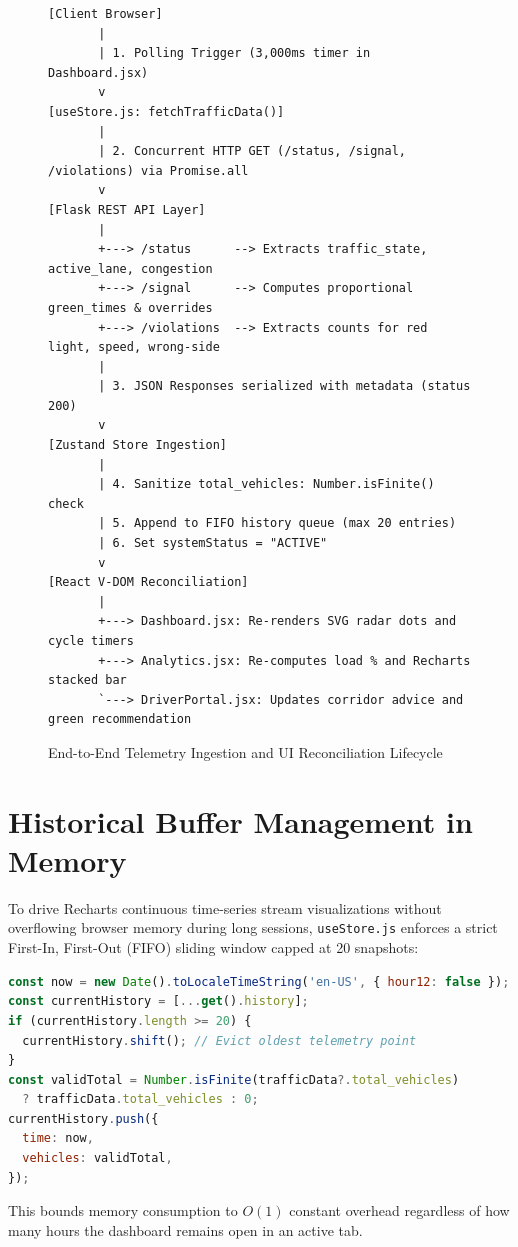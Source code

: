 \documentclass[11pt,a4paper,oneside]{report}
\begin{document}
\begin{figure}[h!]
\centering
\small
\begin{tcolorbox}[colback=white,colframe=branddark,arc=2mm,title=\textbf{End-to-End State Synchronization Flow}]
\begin{verbatim}
[Client Browser]
       |
       | 1. Polling Trigger (3,000ms timer in Dashboard.jsx)
       v
[useStore.js: fetchTrafficData()]
       |
       | 2. Concurrent HTTP GET (/status, /signal, /violations) via Promise.all
       v
[Flask REST API Layer]
       |
       +---> /status      --> Extracts traffic_state, active_lane, congestion
       +---> /signal      --> Computes proportional green_times & overrides
       +---> /violations  --> Extracts counts for red light, speed, wrong-side
       |
       | 3. JSON Responses serialized with metadata (status 200)
       v
[Zustand Store Ingestion]
       |
       | 4. Sanitize total_vehicles: Number.isFinite() check
       | 5. Append to FIFO history queue (max 20 entries)
       | 6. Set systemStatus = "ACTIVE"
       v
[React V-DOM Reconciliation]
       |
       +---> Dashboard.jsx: Re-renders SVG radar dots and cycle timers
       +---> Analytics.jsx: Re-computes load % and Recharts stacked bar
       `---> DriverPortal.jsx: Updates corridor advice and green recommendation
\end{verbatim}
\end{tcolorbox}
\caption{End-to-End Telemetry Ingestion and UI Reconciliation Lifecycle}
\label{fig:data_flow_diag}
\end{figure}

\section{Historical Buffer Management in Memory}
To drive Recharts continuous time-series stream visualizations without overflowing browser memory during long sessions, \texttt{useStore.js} enforces a strict First-In, First-Out (FIFO) sliding window capped at 20 snapshots:
\begin{lstlisting}[language=JavaScript]
const now = new Date().toLocaleTimeString('en-US', { hour12: false });
const currentHistory = [...get().history];
if (currentHistory.length >= 20) {
  currentHistory.shift(); // Evict oldest telemetry point
}
const validTotal = Number.isFinite(trafficData?.total_vehicles)
  ? trafficData.total_vehicles : 0;
currentHistory.push({
  time: now,
  vehicles: validTotal,
});
\end{lstlisting}
This bounds memory consumption to $O(1)$ constant overhead regardless of how many hours the dashboard remains open in an active tab.
\end{document}
